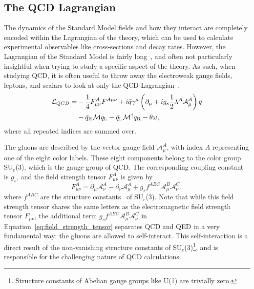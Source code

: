 \subsection{The QCD Lagrangian}
\label{sec:qcd_lagrangian}

The dynamics of the Standard Model fields and how they interact are completely encoded within the Lagrangian of the theory, which can be used to calculate experimental observables like cross-sections and decay rates. However, the Lagrangian of the Standard Model is fairly long~\cite{StandardModelLength1}, and often not particularly insightful when trying to study a specific aspect of the theory. As such, when studying QCD, it is often useful to throw away the electroweak gauge fields, leptons, and scalars to look at only the QCD Lagrangian~\cite{QCDHistory},
%
\begin{align*}
    \label{eq:qcd_lagrangian}
    \mathcal{L}_{Q C D}= & -\frac{1}{4} F_{\mu \nu}^A F^{A \space \mu \nu}+i \bar{q} \gamma^\mu\left(\partial_\mu+i g_s \frac{1}{2} \lambda^A \mathcal{A}_\mu^A\right) q \\
    & -\bar{q}_{\mathrm{R}} \mathcal{M} q_{\mathrm{L}}-\bar{q}_{\mathrm{L}} \mathcal{M}^{\dagger} q_{\mathrm{R}}-\theta \omega,
\end{align*}
%
where all repeated indices are summed over.

The gluons are described by the vector gauge field $\mathcal{A}_\mu^A$, with index $A$ representing one of the eight color labels. These eight components belong to the color group SU$_\text{c}$(3), which is the gauge group of QCD. The corresponding coupling constant is $g_{s}$, and the field strength tensor $F_{\mu \nu}^A$ is given by
%
\begin{equation}
    \label{eq:field_strength_tensor}
    F_{\mu \nu}^A = \partial_\mu \mathcal{A}_\nu^A - \partial_\nu \mathcal{A}_\mu^A + g_s f^{ABC} \mathcal{A}_\mu^B \mathcal{A}_\nu^C,
\end{equation}
%
where $f^{ABC}$ are the structure constants~\cite{StructureConstants} of SU$_\text{c}$(3). Note that while this field strength tensor shares the same letters as the electromagnetic field strength tensor $F_{\mu \nu}$, the additional term $g_s f^{ABC} \mathcal{A}_\mu^B \mathcal{A}_\nu^C$ in Equation~\ref{eq:field_strength_tensor} separates QCD and QED in a very fundamental way: the gluons are allowed to self-interact. This self-interaction is a direct result of the non-vanishing structure constants of SU$_\text{c}$(3)\footnote{Structure constants of Abelian gauge groups like U(1) are trivially zero.}, and is responsible for the challenging nature of QCD calculations.

